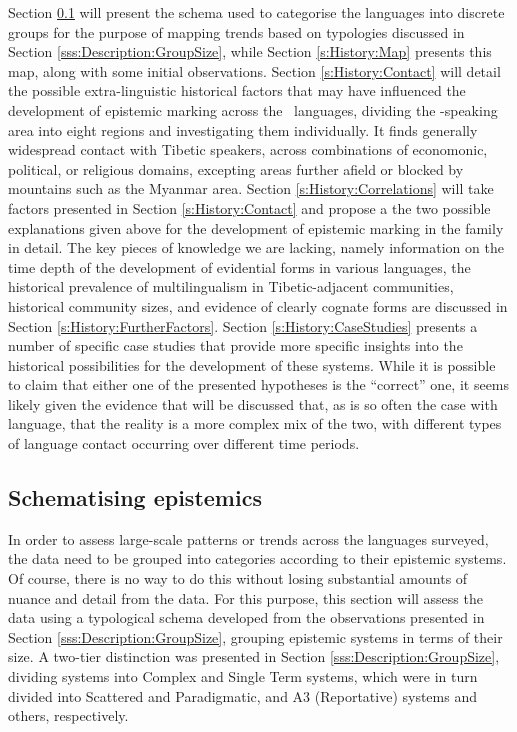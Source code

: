 Section \ref{ss:History:Schema} will present the schema used to categorise the languages into discrete groups for the purpose of mapping trends based on typologies discussed in Section \ref{sss:Description:GroupSize}, while Section \ref{s:History:Map} presents this map, along with some initial observations. Section \ref{s:History:Contact} will detail the possible extra-linguistic historical factors that may have influenced the development of epistemic marking across the \lfam\ languages, dividing the \lfam-speaking area into eight regions and investigating them individually. It finds generally widespread contact with Tibetic speakers, across combinations of economonic, political, or religious domains, excepting areas further afield or blocked by mountains such as the Myanmar area. Section \ref{s:History:Correlations} will take factors presented in Section \ref{s:History:Contact} and propose a the two possible explanations given above for the development of epistemic marking in the family in detail. The key pieces of knowledge we are lacking, namely information on the time depth of the development of evidential forms in various languages, the historical prevalence of multilingualism in Tibetic-adjacent communities, historical community sizes, and evidence of clearly cognate forms are discussed in Section \ref{s:History:FurtherFactors}. Section \ref{s:History:CaseStudies} presents a number of specific case studies that provide more specific insights into the historical possibilities for the development of these systems. While it is possible to claim that either one of the presented hypotheses is the ``correct'' one, it seems likely given the evidence that will be discussed that, as is so often the case with language, that the reality is a more complex mix of the two, with different types of language contact occurring over different time periods.

\subsection{Schematising epistemics}\label{ss:History:Schema}
In order to assess large-scale patterns or trends across the languages surveyed, the data need to be grouped into categories according to their epistemic systems. Of course, there is no way to do this without losing substantial amounts of nuance and detail from the data. For this purpose, this section will assess the data using a typological schema developed from the observations presented in Section \ref{sss:Description:GroupSize}, grouping epistemic systems in terms of their size. A two-tier distinction was presented in Section \ref{sss:Description:GroupSize}, dividing systems into Complex and Single Term systems, which were in turn divided into Scattered and Paradigmatic, and A3 (Reportative) systems and others, respectively.

